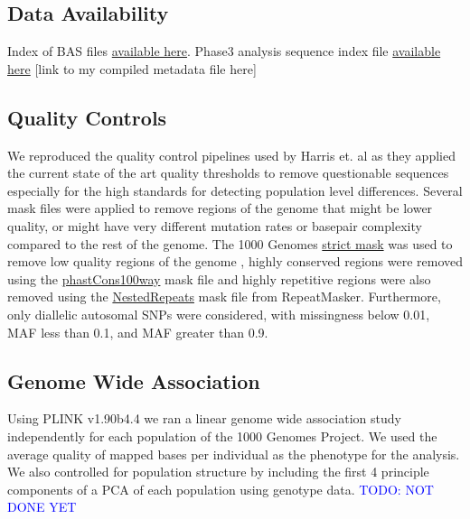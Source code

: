 \documentclass[12pt]{amsart}
\newcommand{\todo}[1]{\textcolor{blue}{TODO: #1}}
\begin{document}
{\subsection{Data Availability}

Index of BAS files \href{http://ftp.1000genomes.ebi.ac.uk/vol1/ftp/data_collections/1000_genomes_project/1000genomes.low_coverage.GRCh38DH.alignment.index}{available here}.
Phase3 analysis sequence index file  \href{http://ftp.1000genomes.ebi.ac.uk/vol1/ftp/phase3/20130502.phase3.analysis.sequence.index}{available here} 
[link to my compiled metadata file here]

\subsection{Quality Controls}
We reproduced the quality control pipelines used by Harris et. al as they applied the current state of the art quality thresholds to remove questionable sequences especially for the high standards for detecting population level differences. 
Several mask files were applied to remove regions of the genome that might be lower quality, or might have very different mutation rates or basepair complexity compared to the rest of the genome. 
The  1000 Genomes \href{http://ftp.1000genomes.ebi.ac.uk/vol1/ftp/release/20130502/supporting/accessible_genome_masks/20141020.strict_mask.whole_genome.bed}{strict mask} was used to remove low quality regions of the genome , highly conserved regions were removed using the \href{http://hgdownload.cse.ucsc.edu/goldenPath/hg19/database/phastConsElements100way.txt.gz}{phastCons100way} mask file and highly repetitive regions were also removed using the \href{http://hgdownload.cse.ucsc.edu/goldenpath/hg19/database/nestedRepeats.txt.gz}{NestedRepeats} mask file from RepeatMasker. 
Furthermore, only diallelic autosomal SNPs were considered, with missingness below 0.01, MAF less than 0.1, and MAF greater than 0.9.

\subsection{Genome Wide Association}

Using PLINK v1.90b4.4 we ran a linear genome wide association study independently for each population of the 1000 Genomes Project. We used the average quality of mapped bases per individual as the phenotype for the analysis. We also controlled for population structure by including the first 4 principle components of a PCA of each population using genotype data. \todo{NOT DONE YET}

}
\end{document}
